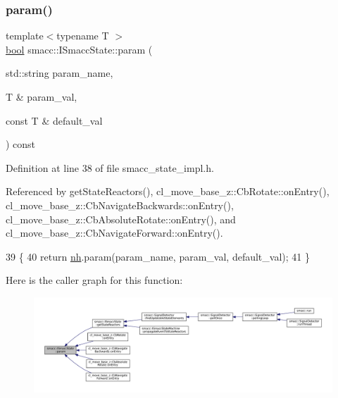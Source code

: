 \subsubsection{\texorpdfstring{param()}{param()}}
{\footnotesize\ttfamily template$<$typename T $>$ \\
\hyperlink{classbool}{bool} smacc\+::\+I\+Smacc\+State\+::param (\begin{DoxyParamCaption}\item[{std\+::string}]{param\+\_\+name,  }\item[{T \&}]{param\+\_\+val,  }\item[{const T \&}]{default\+\_\+val }\end{DoxyParamCaption}) const}



Definition at line 38 of file smacc\+\_\+state\+\_\+impl.\+h.



Referenced by get\+State\+Reactors(), cl\+\_\+move\+\_\+base\+\_\+z\+::\+Cb\+Rotate\+::on\+Entry(), cl\+\_\+move\+\_\+base\+\_\+z\+::\+Cb\+Navigate\+Backwards\+::on\+Entry(), cl\+\_\+move\+\_\+base\+\_\+z\+::\+Cb\+Absolute\+Rotate\+::on\+Entry(), and cl\+\_\+move\+\_\+base\+\_\+z\+::\+Cb\+Navigate\+Forward\+::on\+Entry().


\begin{DoxyCode}
39 \{
40     \textcolor{keywordflow}{return} \hyperlink{classsmacc_1_1ISmaccState_a13fe6e6abfdb87996402189d44b78494}{nh}.param(param\_name, param\_val, default\_val);
41 \}
\end{DoxyCode}
Here is the caller graph for this function\+:
\nopagebreak
\begin{figure}[H]
\begin{center}
\leavevmode
\includegraphics[width=350pt]{classsmacc_1_1ISmaccState_a4f2ff8e3eda8aa9bbb60c8ff17d0def1_icgraph}
\end{center}
\end{figure}
\mbox{\label{classsmacc_1_1ISmaccState_acef404ab3766ddf2892e8dad14a4a7cf}} 
